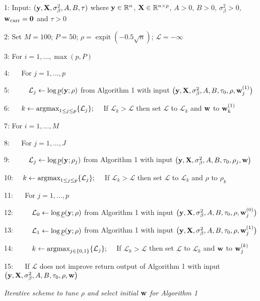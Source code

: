 \documentclass[11pt]{article}
\newtheorem{Main Result}{Main Result}
\def\sL{{\mathcal L}}                            %
\def\vectorfontone{\bf}
\def\vw{{\vectorfontone w}}                      %
\def\vy{{\vectorfontone y}}                      %
\def\vzero{{\vectorfontone 0}}
\def\matrixfontone{\bf}
\def\mX{{\matrixfontone X}}                      %
\def\bR{{\mathbb R}}                             %
\def\argmax{\operatornamewithlimits{\text{argmax}}}
\DeclareMathOperator{\expit}{expit}
\begin{document}
\begin{algorithm}
	\begin{minipage}[h]{\textwidth}
		1: Input: $(\vy,\mX,\sigma_\beta^2,A,B,\tau)$ where $\vy\in\bR^n$, $\mX\in\bR^{n\times p}$, $A>0$, $B>0$,
		$\sigma_\beta^2>0$, $\vw_{\mbox{\scriptsize curr}}=\vzero$ and $\tau>0$
		
		2: Set $M = 100$; $P=50$; $\rho = \expit(-0.5\sqrt{n})$; $\sL = -\infty$
		
		3: For $i = 1,\ldots,\max(p,P)$
		
		4: $\quad$ For $j=1,\ldots,p$
		
		5: $\quad\quad$ $\sL_j \leftarrow \log \underline{p}(\vy;\rho)$
		from
		Algorithm 1 with input $\big(\vy,\mX,\sigma_\beta^2,A,B,\tau_0,\rho,\vw_j^{(1)}\big)$
		
		
		6: $\quad$ $k \leftarrow \argmax_{1\le j\le p} \{\sL_j\}; \quad$
		If $\sL_k > \sL$ then set $\sL$ to $\sL_k$ and $\vw$ to $\vw_k^{(1)}$
		
		7: For $i=1,\ldots,M$
		
		8: $\quad$  For  $j=1,\ldots,J$
		
		9: $\quad\quad$ $\sL_j \leftarrow \log\underline{p}(\vy;\rho_j)$
		from
		Algorithm 1 with input $\big(\vy,\mX,\sigma_\beta^2,A,B,\tau_0,\rho_j,\vw\big)$
		
		
		10: $\quad k \leftarrow \argmax_{1\le j\le p} \{\sL_j\}; \quad$
		If $\sL_k > \sL$ then set $\sL$ to $\sL_k$ and $\rho$ to $\rho_k$
		
		11: $\quad$ For $j=1,\ldots,p$
		
		12: $\quad\quad$ $\sL_0 \leftarrow \log \underline{p}(\vy;\rho)$
		from
		Algorithm 1 with input $\big(\vy,\mX,\sigma_\beta^2,A,B,\tau_0,\rho,\vw_j^{(0)}\big)$
		
		13: $\quad\quad$  $\sL_1 \leftarrow \log \underline{p}(\vy;\rho)$
		from
		Algorithm 1 with input $\big(\vy,\mX,\sigma_\beta^2,A,B,\tau_0,\rho,\vw_j^{(1)}\big)$
		
		14: $\quad\quad$  $k \leftarrow \argmax_{j\in\{0,1\}} \{\sL_j\}; \quad$
		If $\sL_k > \sL$ then set $\sL$ to $\sL_k$ and $\vw$ to $\vw_j^{(k)}$
		
		
		15: $\quad$  If $\sL$ does not improve return output of Algorithm 1 with input $\big(\vy,\mX,\sigma_\beta^2,A,B,\tau_0,\rho,\vw\big)$
	\end{minipage}
	\caption{\it Iterative scheme to
		tune $\rho$ and select initial $\vw$ for Algorithm 1}
	\label{alg:PathSearch}
\end{algorithm}
\end{document}
